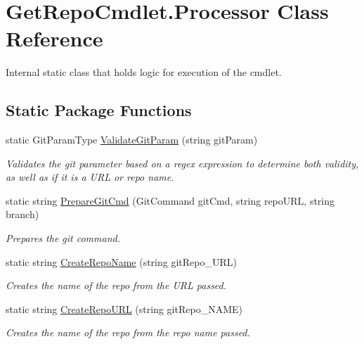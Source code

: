 \hypertarget{class_get_repo_cmdlet_1_1_processor}{}\section{Get\+Repo\+Cmdlet.\+Processor Class Reference}
\label{class_get_repo_cmdlet_1_1_processor}


Internal static class that holds logic for execution of the cmdlet.  


\subsection*{Static Package Functions}
\begin{DoxyCompactItemize}
\item 
static Git\+Param\+Type \mbox{\hyperlink{class_get_repo_cmdlet_1_1_processor_a0fba012ba15720a0fcd419c44b757c5b}{Validate\+Git\+Param}} (string git\+Param)
\begin{DoxyCompactList}\small\item\em Validates the git parameter based on a regex expression to determine both validity, as well as if it is a U\+RL or repo name. \end{DoxyCompactList}\item 
static string \mbox{\hyperlink{class_get_repo_cmdlet_1_1_processor_a9c532782d2575d5244440407103b4352}{Prepare\+Git\+Cmd}} (Git\+Command git\+Cmd, string repo\+U\+RL, string branch)
\begin{DoxyCompactList}\small\item\em Prepares the git command. \end{DoxyCompactList}\item 
static string \mbox{\hyperlink{class_get_repo_cmdlet_1_1_processor_a4a96e92b1c20e4f4fc38f9230d51912a}{Create\+Repo\+Name}} (string git\+Repo\+\_\+\+U\+RL)
\begin{DoxyCompactList}\small\item\em Creates the name of the repo from the U\+RL passed. \end{DoxyCompactList}\item 
static string \mbox{\hyperlink{class_get_repo_cmdlet_1_1_processor_ae8b0a813f91987946bfc8e218b3ab396}{Create\+Repo\+U\+RL}} (string git\+Repo\+\_\+\+N\+A\+ME)
\begin{DoxyCompactList}\small\item\em Creates the name of the repo from the repo name passed. \end{DoxyCompactList}\item 

\end{DoxyCompactItemize}
